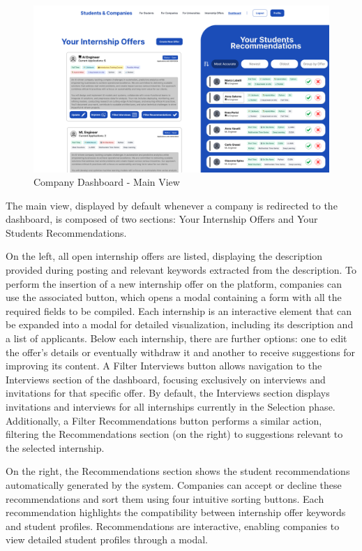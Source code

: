 \begin{figure} [H]
    \begin{center}
        \includegraphics[width=0.9\linewidth]{LaTeXCode/images/UI/Company Dashboard - Main View.png}
        \caption{Company Dashboard - Main View}
        \label{fig: dashboard_company_main}
    \end{center}
\end{figure}

The main view, displayed by default whenever a company is redirected to the dashboard, is composed of two sections: Your Internship Offers and Your Students Recommendations.

On the left, all open internship offers are listed, displaying the description provided during posting and relevant keywords extracted from the description.
To perform the insertion of a new internship offer on the platform, companies can use the associated button, which opens a modal containing a form with all the required fields to be compiled.
Each internship is an interactive element that can be expanded into a modal for detailed visualization, including its description and a list of applicants. Below each internship, there are further options: one to edit the offer's details or eventually withdraw it and another to receive suggestions for improving its content. A Filter Interviews button allows navigation to the Interviews section of the dashboard, focusing exclusively on interviews and invitations for that specific offer. By default, the Interviews section displays invitations and interviews for all internships currently in the Selection phase. Additionally, a Filter Recommendations button performs a similar action, filtering the Recommendations section (on the right) to suggestions relevant to the selected internship.

On the right, the Recommendations section shows the student recommendations automatically generated by the system. Companies can accept or decline these recommendations and sort them using four intuitive sorting buttons. Each recommendation highlights the compatibility between internship offer keywords and student profiles. Recommendations are interactive, enabling companies to view detailed student profiles through a modal.

